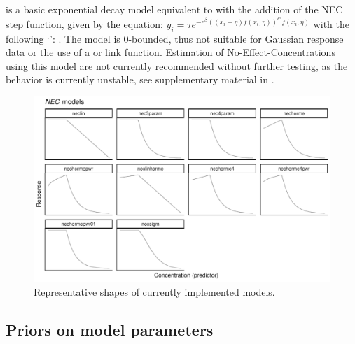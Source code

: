 \documentclass[
  shortnames]{jss}
\newcommand{\cls}[1]{`\code{#1}'}
\begin{document}
 is a basic exponential decay model equivalent to  with the addition of the NEC step function, given by the equation:
\(y_i = \tau e^{-e^{\beta} ((x_i - \eta) f(x_i, \eta))^{e^\epsilon} f(x_i, \eta)}\)
with the following \cls{brmsformula}: . The model is 0-bounded, thus not suitable for Gaussian response data or the use of a  or  link function. Estimation of No-Effect-Concentrations using this model are not currently recommended without further testing, as the behavior is currently unstable, see supplementary material in \citet{fisher2023ieam}.

\begin{figure}[t!]
  \centering
  \includegraphics[width=1\textwidth]{../vignettes/vignette-fig-exmp2b-theoretical_nec_curves.pdf}
  \caption{Representative shapes of currently implemented   models.}
  \label{fig2}
\end{figure}

\hypertarget{priors-on-model-parameters}{%
\subsection{Priors on model parameters}\label{priors-on-model-parameters}}
\end{document}
